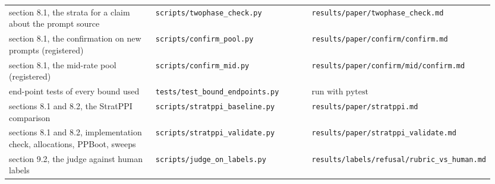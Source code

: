 \documentclass[11pt]{article}
\begin{document}
\begin{longtable}{@{}>{\raggedright\arraybackslash}p{0.334\linewidth}>{\raggedright\arraybackslash}p{0.333\linewidth}>{\raggedright\arraybackslash}p{0.279\linewidth}@{}}
\hspace{0pt}section 8.1, the strata for a claim about the prompt source & \hspace{0pt}\texttt{scripts/\allowbreak twophase\_\allowbreak check.py} & \hspace{0pt}\texttt{results/\allowbreak paper/\allowbreak twophase\_\allowbreak check.md} \\
\hspace{0pt}section 8.1, the confirmation on new prompts (registered) & \hspace{0pt}\texttt{scripts/\allowbreak confirm\_\allowbreak pool.py} & \hspace{0pt}\texttt{results/\allowbreak paper/\allowbreak confirm/\allowbreak confirm.md} \\
\hspace{0pt}section 8.1, the mid-rate pool (registered) & \hspace{0pt}\texttt{scripts/\allowbreak confirm\_\allowbreak mid.py} & \hspace{0pt}\texttt{results/\allowbreak paper/\allowbreak confirm/\allowbreak mid/\allowbreak confirm.md} \\
\hspace{0pt}end-point tests of every bound used & \hspace{0pt}\texttt{tests/\allowbreak test\_\allowbreak bound\_\allowbreak endpoints.py} & \hspace{0pt}run with $\text{pytest}$ \\
\hspace{0pt}sections 8.1 and 8.2, the StratPPI comparison & \hspace{0pt}\texttt{scripts/\allowbreak stratppi\_\allowbreak baseline.py} & \hspace{0pt}\texttt{results/\allowbreak paper/\allowbreak stratppi.md} \\
\hspace{0pt}sections 8.1 and 8.2, implementation check, allocations, PPBoot, sweeps & \hspace{0pt}\texttt{scripts/\allowbreak stratppi\_\allowbreak validate.py} & \hspace{0pt}\texttt{results/\allowbreak paper/\allowbreak stratppi\_\allowbreak validate.md} \\
\hspace{0pt}section 9.2, the judge against human labels & \hspace{0pt}\texttt{scripts/\allowbreak judge\_\allowbreak on\_\allowbreak labels.py} & \hspace{0pt}\texttt{results/\allowbreak labels/\allowbreak refusal/\allowbreak rubric\_\allowbreak vs\_\allowbreak human.md} \\

\end{longtable}
\end{document}
